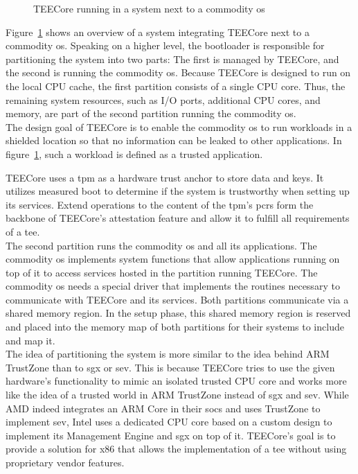 \label{sec:30:system_overview}
\begin{figure}
  \begin{center}
    
    \caption{TEECore running in a system next to a commodity \gls{os}}
    \label{fig:30:tee_system_design}
  \end{center}
\end{figure}

Figure~\ref{fig:30:tee_system_design} shows an overview of a system integrating
TEECore next to a commodity \gls{os}. Speaking on a higher level, the bootloader
is responsible for partitioning the system into two parts: The first is managed
by TEECore, and the second is running the commodity \gls{os}. Because TEECore is
designed to run on the local CPU cache, the first partition consists of a single
CPU core. Thus, the remaining system resources, such as I/O ports, additional
CPU cores, and memory, are part of the second partition running the commodity
\gls{os}.\\

The design goal of TEECore is to enable the commodity \gls{os} to run workloads
in a shielded location so that no information can be leaked to other
applications. In figure~\ref{fig:30:tee_system_design}, such a workload is
defined as a trusted application.

TEECore uses a \gls{tpm} as a hardware trust anchor to store data and keys. It
utilizes measured boot to determine if the system is trustworthy when setting up
its services. Extend operations to the content of the \gls{tpm}'s \glspl{pcr}
form the backbone of TEECore's attestation feature and allow it to fulfill all
requirements of a \gls{tee}.\\

The second partition runs the commodity \gls{os} and all its applications. The
commodity \gls{os} implements system functions that allow applications running
on top of it to access services hosted in the partition running TEECore. The
commodity \gls{os} needs a special driver that implements the routines necessary
to communicate with TEECore and its services. Both partitions communicate via a
shared memory region. In the setup phase, this shared memory region is reserved
and placed into the memory map of both partitions for their systems to include
and map it.\\

The idea of partitioning the system is more similar to the idea behind ARM
TrustZone than to \gls{sgx} or \gls{sev}. This is because TEECore
tries to use the given hardware's functionality to mimic an isolated trusted CPU
core and works more like the idea of a trusted world in ARM TrustZone instead of
\gls{sgx} and \gls{sev}. While AMD indeed integrates an ARM Core in their
\glspl{soc} and uses TrustZone to implement \gls{sev}, Intel uses a dedicated
CPU core based on a custom design to implement its Management Engine and
\gls{sgx} on top of it. TEECore's goal is to provide a solution for
x86 that allows the implementation of a \gls{tee} without using proprietary
vendor features.

